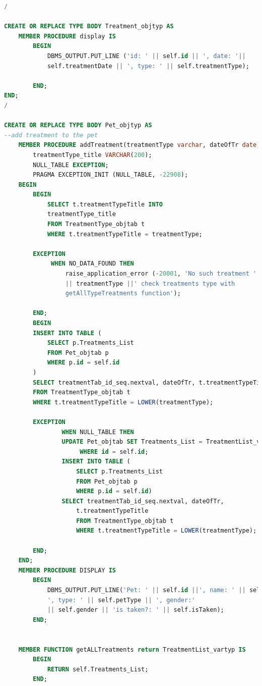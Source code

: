 \documentclass{FR16}
\begin{document}
\begin{lstlisting}[language=Sql, basicstyle=\scriptsize]
/

CREATE OR REPLACE TYPE BODY Treatment_objtyp AS
    MEMBER PROCEDURE display IS
        BEGIN
            DBMS_OUTPUT.PUT_LINE ('id: ' || self.id || ', date: '||
            self.treatmentDate || ', type: ' || self.treatmentType);
            
        END;
END;        
/

CREATE OR REPLACE TYPE BODY Pet_objtyp AS 
--add treatment to the pet
    MEMBER PROCEDURE addTreatment(treatmentType varchar, dateOfTr date) IS
        treatmentType_title VARCHAR(200);
        NULL_TABLE EXCEPTION;
        PRAGMA EXCEPTION_INIT (NULL_TABLE, -22908);
    BEGIN
        BEGIN
            SELECT t.treatmentTypeTitle INTO 
            treatmentType_title 
            FROM TreatmentType_objtab t
            WHERE t.treatmentTypeTitle = treatmentType;
    
        EXCEPTION
             WHEN NO_DATA_FOUND THEN
                 raise_application_error (-20001, 'No such treatment ' 
                 || treatmentType ||' check treatments type with 
                 getAllTypeTreatments function');
    
        END;
        BEGIN
        INSERT INTO TABLE (
            SELECT p.Treatments_List
            FROM Pet_objtab p
            WHERE p.id = self.id
        )
        SELECT treatmentTab_id_seq.nextval, dateOfTr, t.treatmentTypeTitle
        FROM TreatmentType_objtab t
        WHERE t.treatmentTypeTitle = LOWER(treatmentType);

        EXCEPTION
                WHEN NULL_TABLE THEN
                UPDATE Pet_objtab SET Treatments_List = TreatmentList_vartyp()
                     WHERE id = self.id;
                INSERT INTO TABLE (
                    SELECT p.Treatments_List
                    FROM Pet_objtab p
                    WHERE p.id = self.id)
                SELECT treatmentTab_id_seq.nextval, dateOfTr, 
                    t.treatmentTypeTitle
                    FROM TreatmentType_objtab t
                    WHERE t.treatmentTypeTitle = LOWER(treatmentType);
        
        END;      
    END;
    MEMBER PROCEDURE DISPLAY IS
        BEGIN
            DBMS_OUTPUT.PUT_LINE('Pet: ' || self.id ||', name: ' || self.name ||
            ', type: ' || self.petType || ', gender:' 
            || self.gender || 'is taken?: ' || self.isTaken);
        END;


    MEMBER FUNCTION getALLTreatments return TreatmentList_vartyp IS
        BEGIN
            RETURN self.Treatments_List; 
        END;    


\end{lstlisting}
\end{document}
